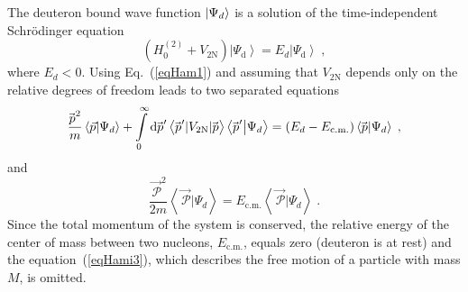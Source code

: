 The deuteron bound wave function $\ket{\Psi_{d}}$ is a solution of the time-independent Schr{\"o}dinger equation
\begin{equation}
\left(H^{(2)}_{0} + V_{\mathrm{2N}}\right)\left|\Psi_{\mathrm{d}}\right> = E_{d}\left|\Psi_{\mathrm{d}}\right>\;,
\end{equation}
where $E_{d} < 0$. Using Eq.~(\ref{eqHam1}) and assuming that $V_{\mathrm{2N}}$ depends only on the relative degrees of freedom leads to two separated equations
\begin{equation}
\frac{\!\vec{\,p}^{2}}{m}\braket{\vec{p}}{\Psi_{d}}
+ \int\limits_{0}^{\infty}\mathrm{d}\!\vec{\,p}^{\prime} \left<\!\vec{\,p}^{\prime}|V_{\mathrm{2N}}|\!\vec{\,p}\right>
\braket{\!\vec{\,p}^{\prime}}{\Psi_{d}} = \left(E_{d} - E_{\mathrm{c.m.}}\right)\braket{\!\vec{\,p}}{\Psi_{d}}\;,
\label{eqHam2}
\end{equation}
and
\begin{equation}
\frac{\!\vec{\mathcal{\,P}}^{2}}{2m}\left<\!\vec{\mathcal{\,P}}|\Psi_{d}\right> = E_{\mathrm{c.m.}}\left<\!\vec{\mathcal{\,P}}|\Psi_{d}\right>\;.
\label{eqHami3}
\end{equation}
Since the total momentum of the system is conserved, the relative energy of the center of mass between two nucleons, $E_{\mathrm{c.m.}}$, equals zero (deuteron is at rest) and the equation~(\ref{eqHami3}), which describes the free motion of a particle with mass $M$, is omitted.

